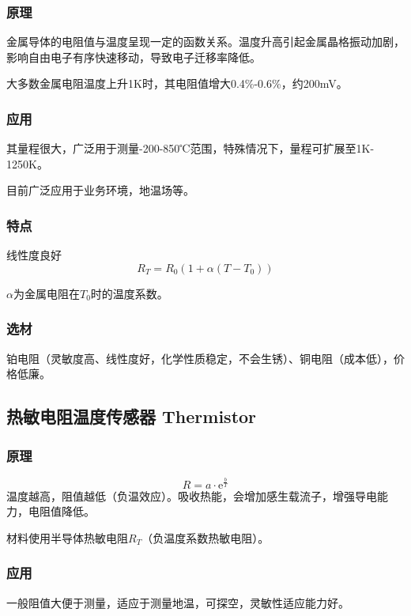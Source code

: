 \documentclass[UTF8,11pt]{ctexbook}
\begin{document}
\subsubsection{原理}

金属导体的电阻值与温度呈现一定的函数关系。温度升高引起金属晶格振动加剧，影响自由电子有序快速移动，导致电子迁移率降低。

大多数金属电阻温度上升1K时，其电阻值增大0.4\%-0.6\%，约200mV。

\subsubsection{应用}

其量程很大，广泛用于测量-200-850℃范围，特殊情况下，量程可扩展至1K-1250K。

目前广泛应用于业务环境，地温场等。

\subsubsection{特点}

线性度良好
\[
R_T=R_0(1+\alpha(T-T_0))
\]

\(\alpha\)为金属电阻在\(T_0\)时的温度系数。

\subsubsection{选材}

铂电阻（灵敏度高、线性度好，化学性质稳定，不会生锈）、铜电阻（成本低），价格低廉。
	
\subsection{热敏电阻温度传感器 Thermistor}

\subsubsection{原理}
\[
R=a\cdot\mathrm{e}^{\frac{b}{T}}
\]
温度越高，阻值越低（负温效应）。吸收热能，会增加感生载流子，增强导电能力，电阻值降低。

材料使用半导体热敏电阻\(R_T\)（负温度系数热敏电阻）。

\subsubsection{应用}

一般阻值大便于测量，适应于测量地温，可探空，灵敏性适应能力好。
\end{document}

